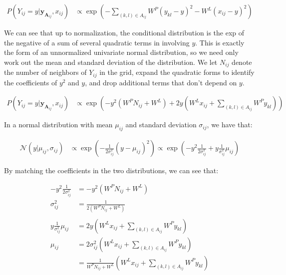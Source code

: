 \documentclass[11pt]{article}
\newcommand{\mbf}[1]{{\mathbf{#1}}}
\begin{document}
\begin{align}
P(Y_{ij}=y|\mbf{y}_{\mbf{A}_{ij}},x_{ij}) &\propto  \exp\left(-\sum_{(k,l)\in A_{ij}} W^P(y_{kl}-y)^2 - W^L(x_{ij}-y)^2 \right)
\end{align}

We can see that up to normalization, the conditional distribution is the exp of the negative of a sum of several quadratic terms in involving $y$. This is exactly the form of an unnormalized univariate normal distribution, so we need only work out the mean and standard deviation of the distribution. We let $N_{ij}$ denote the number of neighbors of $Y_{ij}$ in the grid, expand the quadratic forms to identify the coefficients of $y^2$ and $y$, and drop additional terms that don't depend on $y$.

\begin{align}
P(Y_{ij}=y|\mbf{y}_{\mbf{A}_{ij}},x_{ij}) &\propto  \exp\left(- y^2(W^PN_{ij} + W^L) +  2y\left(W^Lx_{ij} + \sum_{(k,l)\in A_{ij}} W^Py_{kl}\right) \right)
\end{align}

In a normal distribution with mean $\mu_{ij}$ and standard deviation $\sigma_{ij}$, we have that:

\begin{align}
\mathcal{N}(y|\mu_{ij},\sigma_{ij}) &\propto  \exp\left(-\frac{1}{2\sigma_{ij}^2}(y-\mu_{ij})^2\right)
\propto  \exp\left(-y^2\frac{1}{2\sigma_{ij}^2} +y\frac{1}{\sigma_{ij}^2}\mu_{ij}\right)
\end{align}

By matching the coefficients in the two distributions, we can see that:

\begin{align}
-y^2\frac{1}{2\sigma_{ij}^2} &= - y^2(W^PN_{ij} + W^L)\\
\sigma^2_{ij} &= \frac{1}{2(W^PN_{ij} + W^L)}\\
&\\
y\frac{1}{\sigma_{ij}^2}\mu_{ij} &= 2y\left(W^L x_{ij} + \sum_{(k,l)\in A_{ij}} W^Py_{kl}\right)\\
\mu_{ij}&=2\sigma_{ij}^2\left(W^Lx_{ij} + \sum_{(k,l)\in A_{ij}} W^Py_{kl}\right)\\
&=\frac{1}{W^PN_{ij} + W^L}\left(W^Lx_{ij} + \sum_{(k,l)\in A_{ij}} W^Py_{kl}\right)
\end{align}
\end{document}
